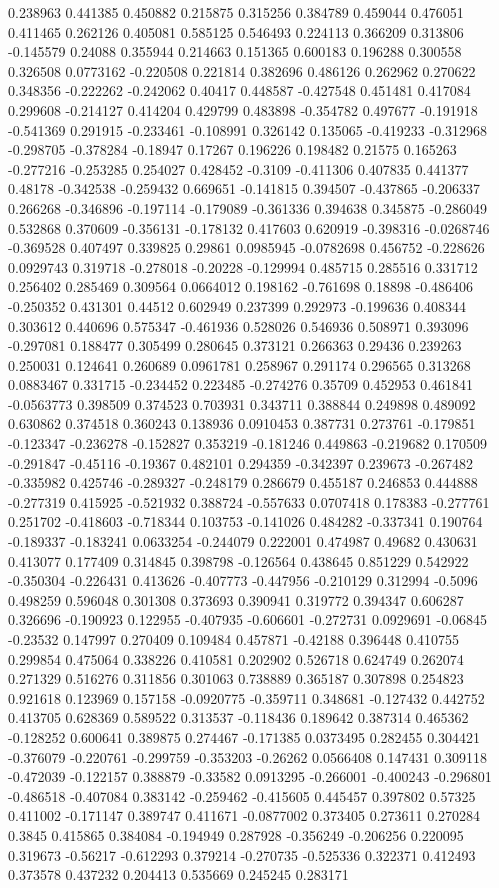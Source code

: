 0.238963 0.441385 0.450882 0.215875 0.315256 0.384789 0.459044 0.476051 0.411465 0.262126 0.405081 0.585125 0.546493 0.224113 0.366209 0.313806 -0.145579 0.24088 0.355944 0.214663 0.151365 0.600183 0.196288 0.300558 0.326508 0.0773162 -0.220508 0.221814 0.382696 0.486126 0.262962 0.270622 0.348356 -0.222262 -0.242062 0.40417 0.448587 -0.427548 0.451481 0.417084 0.299608 -0.214127 0.414204 0.429799 0.483898 -0.354782 0.497677 -0.191918 -0.541369 0.291915 -0.233461 -0.108991 0.326142 0.135065 -0.419233 -0.312968 -0.298705 -0.378284 -0.18947 0.17267 0.196226 0.198482 0.21575 0.165263 -0.277216 -0.253285 0.254027 0.428452 -0.3109 -0.411306 0.407835 0.441377 0.48178 -0.342538 -0.259432 0.669651 -0.141815 0.394507 -0.437865 -0.206337 0.266268 -0.346896 -0.197114 -0.179089 -0.361336 0.394638 0.345875 -0.286049 0.532868 0.370609 -0.356131 -0.178132 0.417603 0.620919 -0.398316 -0.0268746 -0.369528 0.407497 0.339825 0.29861 0.0985945 -0.0782698 0.456752 -0.228626 0.0929743 0.319718 -0.278018 -0.20228 -0.129994 0.485715 0.285516 0.331712 0.256402 0.285469 0.309564 0.0664012 0.198162 -0.761698 0.18898 -0.486406 -0.250352 0.431301 0.44512 0.602949 0.237399 0.292973 -0.199636 0.408344 0.303612 0.440696 0.575347 -0.461936 0.528026 0.546936 0.508971 0.393096 -0.297081 0.188477 0.305499 0.280645 0.373121 0.266363 0.29436 0.239263 0.250031 0.124641 0.260689 0.0961781 0.258967 0.291174 0.296565 0.313268 0.0883467 0.331715 -0.234452 0.223485 -0.274276 0.35709 0.452953 0.461841 -0.0563773 0.398509 0.374523 0.703931 0.343711 0.388844 0.249898 0.489092 0.630862 0.374518 0.360243 0.138936 0.0910453 0.387731 0.273761 -0.179851 -0.123347 -0.236278 -0.152827 0.353219 -0.181246 0.449863 -0.219682 0.170509 -0.291847 -0.45116 -0.19367 0.482101 0.294359 -0.342397 0.239673 -0.267482 -0.335982 0.425746 -0.289327 -0.248179 0.286679 0.455187 0.246853 0.444888 -0.277319 0.415925 -0.521932 0.388724 -0.557633 0.0707418 0.178383 -0.277761 0.251702 -0.418603 -0.718344 0.103753 -0.141026 0.484282 -0.337341 0.190764 -0.189337 -0.183241 0.0633254 -0.244079 0.222001 0.474987 0.49682 0.430631 0.413077 0.177409 0.314845 0.398798 -0.126564 0.438645 0.851229 0.542922 -0.350304 -0.226431 0.413626 -0.407773 -0.447956 -0.210129 0.312994 -0.5096 0.498259 0.596048 0.301308 0.373693 0.390941 0.319772 0.394347 0.606287 0.326696 -0.190923 0.122955 -0.407935 -0.606601 -0.272731 0.0929691 -0.06845 -0.23532 0.147997 0.270409 0.109484 0.457871 -0.42188 0.396448 0.410755 0.299854 0.475064 0.338226 0.410581 0.202902 0.526718 0.624749 0.262074 0.271329 0.516276 0.311856 0.301063 0.738889 0.365187 0.307898 0.254823 0.921618 0.123969 0.157158 -0.0920775 -0.359711 0.348681 -0.127432 0.442752 0.413705 0.628369 0.589522 0.313537 -0.118436 0.189642 0.387314 0.465362 -0.128252 0.600641 0.389875 0.274467 -0.171385 0.0373495 0.282455 0.304421 -0.376079 -0.220761 -0.299759 -0.353203 -0.26262 0.0566408 0.147431 0.309118 -0.472039 -0.122157 0.388879 -0.33582 0.0913295 -0.266001 -0.400243 -0.296801 -0.486518 -0.407084 0.383142 -0.259462 -0.415605 0.445457 0.397802 0.57325 0.411002 -0.171147 0.389747 0.411671 -0.0877002 0.373405 0.273611 0.270284 0.3845 0.415865 0.384084 -0.194949 0.287928 -0.356249 -0.206256 0.220095 0.319673 -0.56217 -0.612293 0.379214 -0.270735 -0.525336 0.322371 0.412493 0.373578 0.437232 0.204413 0.535669 0.245245 0.283171 